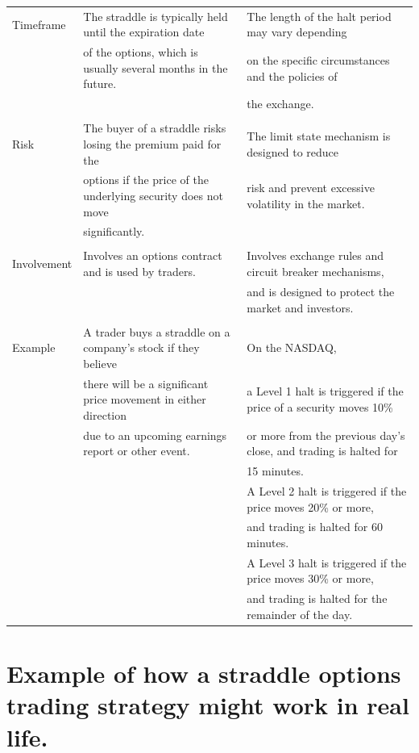 \documentclass[11pt]{article}
\begin{document}
\begin{center}
\begin{tabular}{lll}
Timeframe & The straddle is typically held until the expiration date & The length of the halt period may vary depending\\[0pt]
 & of the options, which is usually several months in the future. & on the specific circumstances and the policies of\\[0pt]
 &  & the exchange.\\[0pt]
 &  & \\[0pt]
Risk & The buyer of a straddle risks losing the premium paid for the & The limit state mechanism is designed to reduce\\[0pt]
 & options if the price of the underlying security does not move & risk and prevent excessive volatility in the market.\\[0pt]
 & significantly. & \\[0pt]
 &  & \\[0pt]
Involvement & Involves an options contract and is used by traders. & Involves exchange rules and circuit breaker mechanisms,\\[0pt]
 &  & and is designed to protect the market and investors.\\[0pt]
 &  & \\[0pt]
Example & A trader buys a straddle on a company's stock if they believe & On the NASDAQ,\\[0pt]
 & there will be a significant price movement in either direction & a Level 1 halt is triggered if the price of a security moves 10\%\\[0pt]
 & due to an upcoming earnings report or other event. & or more from the previous day's close, and trading is halted for\\[0pt]
 &  & 15 minutes.\\[0pt]
 &  & A Level 2 halt is triggered if the price moves 20\% or more,\\[0pt]
 &  & and trading is halted for 60 minutes.\\[0pt]
 &  & A Level 3 halt is triggered if the price moves 30\% or more,\\[0pt]
 &  & and trading is halted for the remainder of the day.\\[0pt]
\end{tabular}
\end{center}

\section{Example of how a straddle options trading strategy might work in real life.}
\label{sec:org2d88411}
\end{document}

